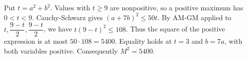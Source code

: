 Put $t=a^2+b^2$. Values with $t\ge9$ are nonpositive, so a positive maximum has $0<t<9$. Cauchy-Schwarz gives $(a+7b)^2\le50t$. By AM-GM applied to $t,\dfrac{9-t}{2},\dfrac{9-t}{2}$, we have $t(9-t)^2\le108$. Thus the square of the positive expression is at most $50\cdot108=5400$. Equality holds at $t=3$ and $b=7a$, with both variables positive. Consequently $\boxed{M^2=5400}$.
